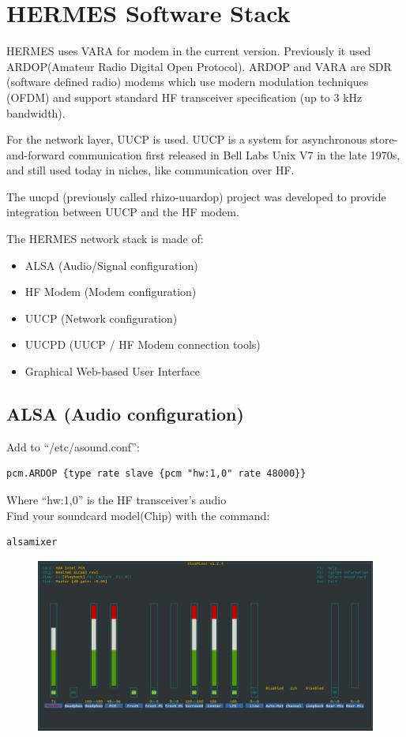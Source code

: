\documentclass[11pt,a4paper]{article}
\begin{document}
\section{HERMES Software Stack}

HERMES uses VARA for modem in the current version. Previously it used ARDOP(Amateur Radio Digital Open Protocol).
ARDOP and VARA are
SDR (software defined radio) modems which use modern modulation techniques (OFDM) and support
standard HF transceiver specification (up to 3 kHz bandwidth).

For the network layer, UUCP is used. UUCP is a system for asynchronous
store-and-forward communication first released in Bell Labs Unix V7 in
the late 1970s, and still used today in niches, like communication over HF.

The uucpd (previously called rhizo-uuardop) project was developed to provide
integration between UUCP and the HF modem.

The HERMES network stack is made of:
\begin{itemize}
\item ALSA (Audio/Signal configuration)
\item HF Modem (Modem configuration)
\item UUCP (Network configuration)
\item UUCPD (UUCP / HF Modem connection tools)
\item Graphical Web-based User Interface
\end{itemize}

\subsection{ALSA (Audio configuration)}

Add to ``/etc/asound.conf'':
\begin{verbatim}
pcm.ARDOP {type rate slave {pcm "hw:1,0" rate 48000}}
\end{verbatim}

Where ``hw:1,0'' is the HF transceiver's audio \\

Find your soundcard model(Chip) with the command:
\begin{verbatim}
alsamixer
\end{verbatim}

\begin{figure}[h!]
  \centering
  \includegraphics[scale=0.23]{screenshots/software_stack/alsamixer.png}
  \label{fig3}
\end{figure}
  
\end{document}
